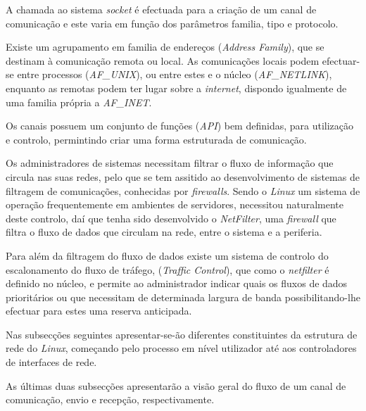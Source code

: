 A chamada ao sistema \textit{socket} é efectuada para a criação de um canal de comunicação e este varia em função dos parâmetros familia, tipo e protocolo.

Existe um agrupamento em familia de endereços (\textit{Address Family}), que se destinam à comunicação remota ou local.
As comunicações locais podem efectuar-se entre processos (\textit{AF\_UNIX}), ou entre estes e o núcleo (\textit{AF\_NETLINK}), enquanto as remotas podem ter lugar sobre a \textit{internet}, dispondo igualmente de uma familia própria a \textit{AF\_INET}.

Os canais possuem um conjunto de funções (\textit{API}) bem definidas, para utilização e controlo, permintindo criar uma forma estruturada de comunicação.

Os administradores de sistemas necessitam filtrar o fluxo de informação que circula nas suas redes, pelo que se tem assitido ao desenvolvimento de sistemas de filtragem de comunicações, conhecidas por \textit{firewalls}.
Sendo o \textit{Linux} um sistema de operação frequentemente em ambientes de servidores, necessitou naturalmente deste controlo, daí que tenha sido desenvolvido o \textit{NetFilter}, uma \textit{firewall} que \color{red}filtra \color{black}o fluxo de dados que circulam na rede, entre o sistema e a periferia.

Para além da filtragem do fluxo de dados existe um sistema de controlo do escalonamento do fluxo de tráfego, (\textit{Traffic Control}), que como o \textit{netfilter} é definido no núcleo, e permite ao administrador indicar quais os fluxos de dados prioritários ou que necessitam de determinada largura de banda possibilitando-lhe efectuar para estes uma reserva anticipada.
 
Nas subsecções seguintes apresentar-se-ão diferentes constituintes da estrutura de rede do \textit{Linux}, começando pelo processo em nível utilizador até aos controladores de interfaces de rede.

\color{red}As últimas duas subsecções apresentarão a visão geral do fluxo de um canal de comunicação, envio e recepção, respectivamente.\color{black}


